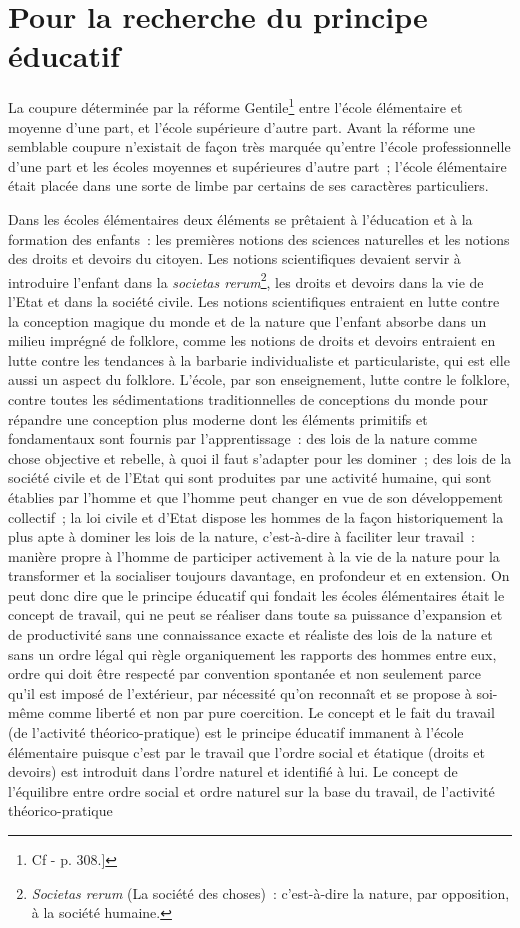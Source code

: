 \documentclass[french,twoside]{book} %
\begin{document}
\section[{Pour la recherche du principe éducatif}]{Pour la recherche du principe éducatif}
\noindent La coupure déterminée par la réforme Gentile\footnote{Cf - p. 308.]} entre l’école élémentaire et moyenne d’une part, et l’école supérieure d’autre part. Avant la réforme une semblable coupure n’existait de façon très marquée qu’entre l’école professionnelle d’une part et les écoles moyennes et supérieures d’autre part ; l’école élémentaire était placée dans une sorte de limbe par certains de ses caractères particuliers.\par
Dans les écoles élémentaires deux éléments se prêtaient à l’éducation et à la formation des enfants : les premières notions des sciences naturelles et les notions des droits et devoirs du citoyen. Les notions scientifiques devaient servir à introduire l’enfant dans la \emph{societas rerum}\footnote{\emph{Societas rerum} (La société des choses) : c’est-à-dire la nature, par opposition, à la société humaine.}, les droits et devoirs dans la vie de l’Etat et dans la société civile. Les notions scientifiques entraient en lutte contre la conception magique du monde et de la nature que l’enfant absorbe dans un milieu imprégné de folklore, comme les notions de droits et devoirs entraient en lutte contre les tendances à la barbarie individualiste et particulariste, qui est elle aussi un aspect du folklore. L'école, par son enseignement, lutte contre le folklore, contre toutes les sédimentations traditionnelles de conceptions du monde pour répandre une conception plus moderne dont les éléments primitifs et fondamentaux sont fournis par l’apprentissage : des lois de la nature comme chose objective et rebelle, à quoi il faut s’adapter pour les dominer ; des lois de la société civile et de l’Etat qui sont produites par une activité humaine, qui sont établies par l’homme et que l’homme peut changer en vue de son développement collectif ; la loi civile et d’Etat dispose les hommes de la façon historiquement la plus apte à dominer les lois de la nature, c’est-à-dire à faciliter leur travail : manière propre à l’homme de participer activement à la vie de la nature pour la transformer et la socialiser toujours davantage, en profondeur et en extension. On peut donc dire que le principe éducatif qui fondait les écoles élémentaires était le concept de travail, qui ne peut se réaliser dans toute sa puissance d’expansion et de productivité sans une connaissance exacte et réaliste des lois de la nature et sans un ordre légal qui règle organiquement les rapports des hommes entre eux, ordre qui doit être respecté par convention spontanée et non seulement parce qu’il est imposé de l’extérieur, par nécessité qu’on reconnaît et se propose à soi-même comme liberté et non par pure coercition. Le concept et le fait du travail (de l’activité théorico-pratique) est le principe éducatif immanent à l’école élémentaire puisque c’est par le travail que l’ordre social et étatique (droits et devoirs) est introduit dans l’ordre naturel et identifié à lui. Le concept de l’équilibre entre ordre social et ordre naturel sur la base du travail, de l’activité théorico-pratique 
\end{document}
